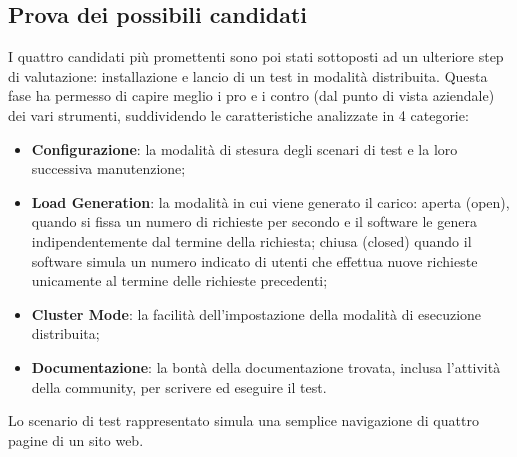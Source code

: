 \subsection{Prova dei possibili candidati}
I quattro candidati più promettenti sono poi stati sottoposti ad un ulteriore step di valutazione: installazione e lancio di un test in modalità distribuita. Questa fase ha permesso di capire meglio i pro e i contro (dal punto di vista aziendale) dei vari strumenti, suddividendo le caratteristiche analizzate in 4 categorie:
\begin{itemize}
	\item \textbf{Configurazione}: la modalità di stesura degli scenari di test e la loro successiva manutenzione;
	\item \textbf{Load Generation}: la modalità in cui viene generato il carico: aperta (open), quando si fissa un numero di richieste per secondo e il software le genera indipendentemente dal termine della richiesta; chiusa (closed) quando il software simula un numero indicato di utenti che effettua nuove richieste unicamente al termine delle richieste precedenti;
	\item \textbf{Cluster Mode}: la facilità dell'impostazione della modalità di esecuzione distribuita;
	\item \textbf{Documentazione}: la bontà della documentazione trovata, inclusa l'attività della community, per scrivere ed eseguire il test.
\end{itemize}
Lo scenario di test rappresentato simula una semplice navigazione di quattro pagine di un sito web.\\
\newpage
